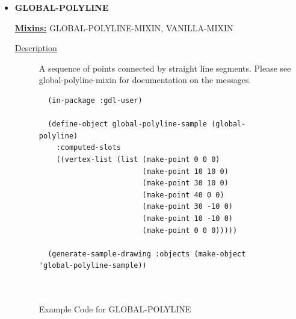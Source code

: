 \documentclass [11pt]{book}
\begin{document}
\begin{itemize}
\begin{description}
\end{description}







\item {}
\textbf{GLOBAL-POLYLINE}


\textbf{
\underline{Mixins:}} GLOBAL-POLYLINE-MIXIN, VANILLA-MIXIN





\begin{description}

\item [
\underline{Description}]


A sequence of points connected by straight line segments. Please see
global-polyline-mixin for documentation on the messages.



\end{description}




\begin{figure}
\begin{lrbox}{\boxedverb}
\begin{minipage}{\linewidth}
{\small

\begin{verbatim}
  (in-package :gdl-user)

  (define-object global-polyline-sample (global-polyline)
    :computed-slots
    ((vertex-list (list (make-point 0 0 0)
                        (make-point 10 10 0)
                        (make-point 30 10 0)
                        (make-point 40 0 0)
                        (make-point 30 -10 0)
                        (make-point 10 -10 0)
                        (make-point 0 0 0)))))
  
  (generate-sample-drawing :objects (make-object 'global-polyline-sample))

  
\end{verbatim}}
\end{minipage}
\end{lrbox}
\fbox{\usebox{\boxedverb}}

\caption{Example Code for GLOBAL-POLYLINE}

\label{fig:example-code-GLOBAL-POLYLINE}

\end{figure}


\end{itemize}
\end{document}
